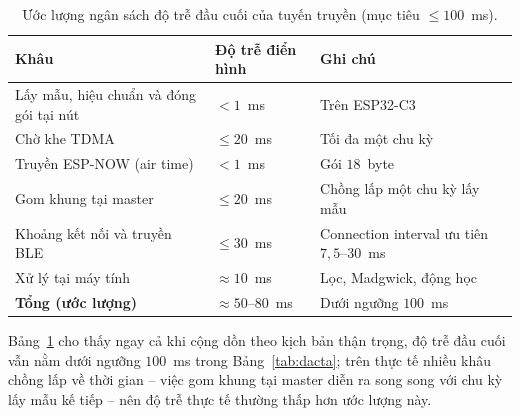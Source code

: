 \documentclass[../DoAn.tex]{subfiles}
\begin{document}
\begin{table}[h]
    \centering
    \caption{Ước lượng ngân sách độ trễ đầu cuối của tuyến truyền (mục tiêu $\le 100$~ms).}
    \label{tab:latencybudget}
    \begin{tabular}{p{6.0cm} p{3.0cm} p{4.2cm}}
        \hline
        \textbf{Khâu}                           & \textbf{Độ trễ điển hình} & \textbf{Ghi chú}                             \\
        \hline
        Lấy mẫu, hiệu chuẩn và đóng gói tại nút & $< 1$~ms                  & Trên ESP32-C3                                \\
        Chờ khe TDMA                            & $\le 20$~ms               & Tối đa một chu kỳ                            \\
        Truyền ESP-NOW (air time)               & $< 1$~ms                  & Gói $18$~byte                                \\
        Gom khung tại master                    & $\le 20$~ms               & Chồng lấp một chu kỳ lấy mẫu                 \\
        Khoảng kết nối và truyền BLE            & $\le 30$~ms               & Connection interval ưu tiên $7{,}5$--$30$~ms \\
        Xử lý tại máy tính                      & $\approx 10$~ms           & Lọc, Madgwick, động học                      \\
        \hline
        \textbf{Tổng (ước lượng)}               & $\approx 50$--$80$~ms     & Dưới ngưỡng $100$~ms                         \\
        \hline
    \end{tabular}
\end{table}

Bảng~\ref{tab:latencybudget} cho thấy ngay cả khi cộng dồn theo kịch bản thận
trọng, độ trễ đầu cuối vẫn nằm dưới ngưỡng $100$~ms trong Bảng~\ref{tab:dacta};
trên thực tế nhiều khâu chồng lấp về thời gian -- việc gom khung tại master diễn
ra song song với chu kỳ lấy mẫu kế tiếp -- nên độ trễ thực tế thường thấp hơn
ước lượng này.
\end{document}
